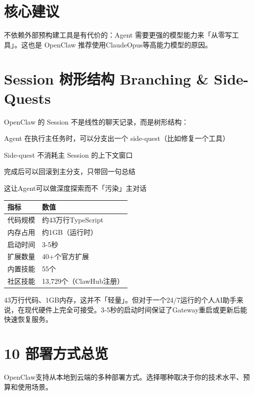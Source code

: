 \documentclass[
  10
]{article}
\newcounter{none} %
\begin{document}
\section{核心建议}\label{ux6838ux5fc3ux5efaux8bae-3}

不依赖外部预构建工具是有代价的：Agent
需要更强的模型能力来「从零写工具」。这也是 OpenClaw
推荐使用ClaudeOpus等高能力模型的原因。

\section{Session 树形结构 Branching \&
Side-Quests}\label{session-ux6811ux5f62ux7ed3ux6784-branching-side-quests}

OpenClaw 的 Session 不是线性的聊天记录，而是树形结构：

Agent 在执行主任务时，可以分支出一个 side-quest（比如修复一个工具）

Side-quest 不消耗主 Session 的上下文窗口

完成后可以回滚到主分支，只带回一句总结

这让Agent可以做深度探索而不「污染」主对话

{\def\LTcaptype{none} %
\begin{longtable}[]{@{}|l|l|@{}}
\toprule\noalign{}
\endhead
\bottomrule\noalign{}
\endlastfoot
\hline
指标 & 数值 \\
\hline
代码规模 & 约43万行TypeScript \\
\hline
内存占用 & 约1GB（运行时） \\
\hline
启动时间 & 3-5秒 \\
\hline
扩展数量 & 40+个官方扩展 \\
\hline
内置技能 & 55个 \\
\hline
社区技能 & 13,729个（ClawHub注册） \\
\hline
\end{longtable}
}

43万行代码、1GB内存，这并不「轻量」。但对于一个24/7运行的个人AI助手来说，在现代硬件上完全可接受。3-5秒的启动时间保证了Gateway重启或更新后能快速恢复服务。

\section{10 部署方式总览}\label{ux90e8ux7f72ux65b9ux5f0fux603bux89c8}

OpenClaw支持从本地到云端的多种部署方式。选择哪种取决于你的技术水平、预算和使用场景。
\end{document}
